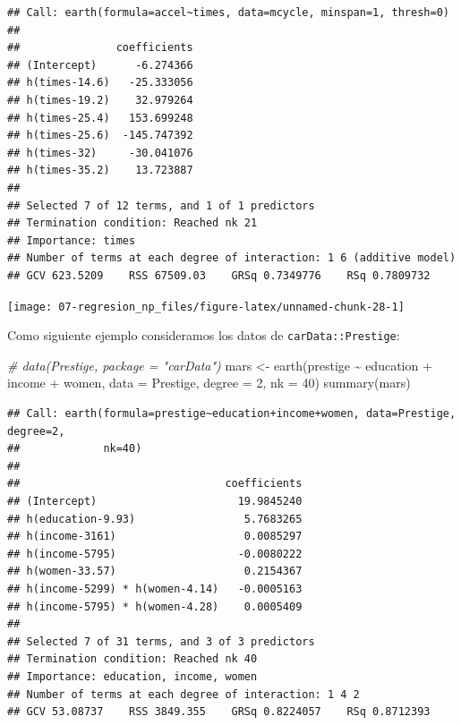 \documentclass[
  spanish,
]{book}
\newenvironment{Shaded}{\begin{snugshade}}{\end{snugshade}}
\newcommand{\AttributeTok}[1]{\textcolor[rgb]{0.77,0.63,0.00}{#1}}
\newcommand{\CommentTok}[1]{\textcolor[rgb]{0.56,0.35,0.01}{\textit{#1}}}
\newcommand{\DecValTok}[1]{\textcolor[rgb]{0.00,0.00,0.81}{#1}}
\newcommand{\FunctionTok}[1]{\textcolor[rgb]{0.00,0.00,0.00}{#1}}
\newcommand{\NormalTok}[1]{#1}
\newcommand{\OtherTok}[1]{\textcolor[rgb]{0.56,0.35,0.01}{#1}}
\newcommand{\SpecialCharTok}[1]{\textcolor[rgb]{0.00,0.00,0.00}{#1}}
\newcommand{\StringTok}[1]{\textcolor[rgb]{0.31,0.60,0.02}{#1}}
\theoremstyle{break}
\theoremstyle{definition}
\theoremstyle{definition}
\theoremstyle{definition}
\theoremstyle{definition}
\theoremstyle{remark}
\begin{document}
\begin{verbatim}
## Call: earth(formula=accel~times, data=mcycle, minspan=1, thresh=0)
## 
##               coefficients
## (Intercept)      -6.274366
## h(times-14.6)   -25.333056
## h(times-19.2)    32.979264
## h(times-25.4)   153.699248
## h(times-25.6)  -145.747392
## h(times-32)     -30.041076
## h(times-35.2)    13.723887
## 
## Selected 7 of 12 terms, and 1 of 1 predictors
## Termination condition: Reached nk 21
## Importance: times
## Number of terms at each degree of interaction: 1 6 (additive model)
## GCV 623.5209    RSS 67509.03    GRSq 0.7349776    RSq 0.7809732
\end{verbatim}

\begin{Shaded}
\end{Shaded}

\begin{center}\texttt{[image: 07-regresion\_np\_files/figure-latex/unnamed-chunk-28-1]} \end{center}

Como siguiente ejemplo consideramos los datos de \texttt{carData::Prestige}:

\begin{Shaded}
\begin{Highlighting}[]
\CommentTok{\# data(Prestige, package = "carData")}
\NormalTok{mars }\OtherTok{\textless{}{-}} \FunctionTok{earth}\NormalTok{(prestige }\SpecialCharTok{\textasciitilde{}}\NormalTok{ education }\SpecialCharTok{+}\NormalTok{ income }\SpecialCharTok{+}\NormalTok{ women, }\AttributeTok{data =}\NormalTok{ Prestige,}
              \AttributeTok{degree =} \DecValTok{2}\NormalTok{, }\AttributeTok{nk =} \DecValTok{40}\NormalTok{)}
\FunctionTok{summary}\NormalTok{(mars)}
\end{Highlighting}
\end{Shaded}

\begin{verbatim}
## Call: earth(formula=prestige~education+income+women, data=Prestige, degree=2,
##             nk=40)
## 
##                                coefficients
## (Intercept)                      19.9845240
## h(education-9.93)                 5.7683265
## h(income-3161)                    0.0085297
## h(income-5795)                   -0.0080222
## h(women-33.57)                    0.2154367
## h(income-5299) * h(women-4.14)   -0.0005163
## h(income-5795) * h(women-4.28)    0.0005409
## 
## Selected 7 of 31 terms, and 3 of 3 predictors
## Termination condition: Reached nk 40
## Importance: education, income, women
## Number of terms at each degree of interaction: 1 4 2
## GCV 53.08737    RSS 3849.355    GRSq 0.8224057    RSq 0.8712393
\end{verbatim}
\end{document}
